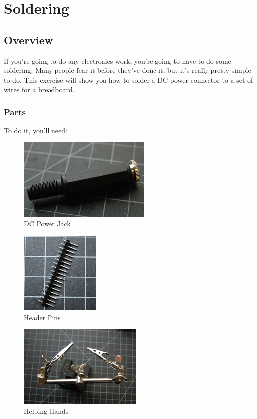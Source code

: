\chapter{Soldering}

\section{Overview}

If you're going to do any electronics work, you're going to have to do some soldering. Many people fear it before they've done it, but it's really pretty simple to do. This exercise will show you how to solder a DC power connector to a set of wires for a breadboard.

\subsection{Parts}

To do it, you'll need:

\begin{figure}[!htb]
     \centering
     \includegraphics[scale=0.3]{img/soldering/power_connector.jpg}
     \caption{DC Power Jack}
     \label{DC Power Jack}
\end{figure}

\begin{figure}[!htb]
     \centering
     \includegraphics[scale=0.3]{img/soldering/headers.jpg}
     \caption{Header Pins}
     \label{Header Pins}
\end{figure}

\begin{figure}[!htb]
     \centering
     \includegraphics[scale=0.3]{img/soldering/helping_hands.jpg}
     \caption{Helping Hands}
     \label{Helping Hands}
\end{figure}

